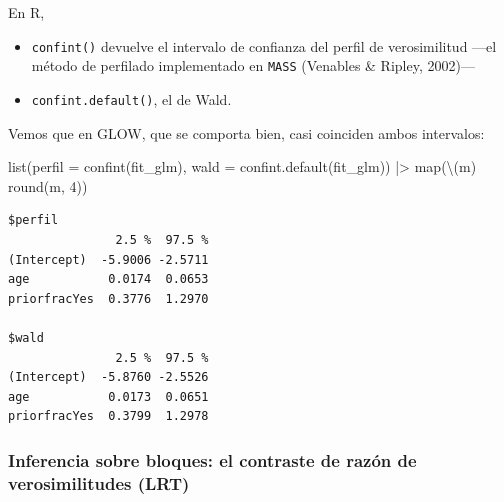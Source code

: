 \documentclass[
  letterpaper,
  DIV=11,
  numbers=noendperiod]{scrartcl}
\newenvironment{Shaded}{\begin{snugshade}}{\end{snugshade}}
\newcommand{\AttributeTok}[1]{\textcolor[rgb]{0.40,0.45,0.13}{#1}}
\newcommand{\DecValTok}[1]{\textcolor[rgb]{0.68,0.00,0.00}{#1}}
\newcommand{\FunctionTok}[1]{\textcolor[rgb]{0.28,0.35,0.67}{#1}}
\newcommand{\NormalTok}[1]{\textcolor[rgb]{0.00,0.23,0.31}{#1}}
\newcommand{\SpecialCharTok}[1]{\textcolor[rgb]{0.37,0.37,0.37}{#1}}
\providecommand{\tightlist}{%
  \setlength{\itemsep}{0pt}\setlength{\parskip}{0pt}}\usepackage{longtable,booktabs,array}
\begin{document}
\begin{tcolorbox}[enhanced jigsaw, breakable, colframe=quarto-callout-tip-color-frame, left=2mm, arc=.35mm, colbacktitle=quarto-callout-tip-color!10!white, toprule=.15mm, colback=white, coltitle=black, rightrule=.15mm, opacitybacktitle=0.6, title=\textcolor{quarto-callout-tip-color}{\faLightbulb}\hspace{0.5em}{🔧 En R. Intervalos de confianza sobre los coeficientes}, titlerule=0mm, toptitle=1mm, bottomtitle=1mm, leftrule=.75mm, bottomrule=.15mm, opacityback=0]

En R,

\begin{itemize}
\tightlist
\item
  \texttt{confint()} devuelve el intervalo de confianza del perfil de
  verosimilitud ---el método de perfilado implementado en \texttt{MASS}
  (Venables \& Ripley, 2002)---
\item
  \texttt{confint.default()}, el de Wald.
\end{itemize}

\end{tcolorbox}

Vemos que en GLOW, que se comporta bien, casi coinciden ambos
intervalos:

\begin{Shaded}
\begin{Highlighting}[]
\FunctionTok{list}\NormalTok{(}\AttributeTok{perfil =} \FunctionTok{confint}\NormalTok{(fit\_glm),}
     \AttributeTok{wald   =} \FunctionTok{confint.default}\NormalTok{(fit\_glm)) }\SpecialCharTok{|\textgreater{}}
  \FunctionTok{map}\NormalTok{(\textbackslash{}(m) }\FunctionTok{round}\NormalTok{(m, }\DecValTok{4}\NormalTok{))}
\end{Highlighting}
\end{Shaded}

\begin{verbatim}
$perfil
               2.5 %  97.5 %
(Intercept)  -5.9006 -2.5711
age           0.0174  0.0653
priorfracYes  0.3776  1.2970

$wald
               2.5 %  97.5 %
(Intercept)  -5.8760 -2.5526
age           0.0173  0.0651
priorfracYes  0.3799  1.2978
\end{verbatim}

\hypertarget{inferencia-sobre-bloques-el-contraste-de-razuxf3n-de-verosimilitudes-lrt}{%
\subsubsection{Inferencia sobre bloques: el contraste de razón de
verosimilitudes
(LRT)}\label{inferencia-sobre-bloques-el-contraste-de-razuxf3n-de-verosimilitudes-lrt}}
\end{document}
